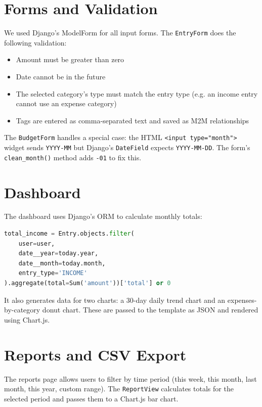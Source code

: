 \documentclass[12pt,a4paper]{report}
\begin{document}
\section{Forms and Validation}

We used Django's ModelForm for all input forms. The \texttt{EntryForm} does the following validation:

\begin{itemize}
  \item Amount must be greater than zero
  \item Date cannot be in the future
  \item The selected category's type must match the entry type (e.g. an income entry cannot use an expense category)
  \item Tags are entered as comma-separated text and saved as M2M relationships
\end{itemize}

The \texttt{BudgetForm} handles a special case: the HTML \texttt{<input type="month">} widget sends \texttt{YYYY-MM} but Django's \texttt{DateField} expects \texttt{YYYY-MM-DD}. The form's \texttt{clean\_month()} method adds \texttt{-01} to fix this.

\section{Dashboard}

The dashboard uses Django's ORM to calculate monthly totals:

\begin{lstlisting}[language=Python]
total_income = Entry.objects.filter(
    user=user,
    date__year=today.year,
    date__month=today.month,
    entry_type='INCOME'
).aggregate(total=Sum('amount'))['total'] or 0
\end{lstlisting}

It also generates data for two charts: a 30-day daily trend chart and an expenses-by-category donut chart. These are passed to the template as JSON and rendered using Chart.js.

\section{Reports and CSV Export}

The reports page allows users to filter by time period (this week, this month, last month, this year, custom range). The \texttt{ReportView} calculates totals for the selected period and passes them to a Chart.js bar chart.
\end{document}
